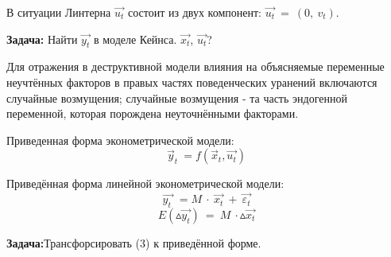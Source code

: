 \documentclass[12pt,a4paper]{article}
\begin{document}
	В ситуации Линтерна $\displaystyle \overrightarrow{u_{t}}$ состоит из двух компонент: $\displaystyle \overrightarrow{u_{t}} \ =\ ( 0,\ v_{t})$.

	\textbf{Задача:} Найти $\displaystyle \overrightarrow{y_{t}}$ в моделе Кейнса. $\displaystyle \overrightarrow{x_{t}}$, $\displaystyle \overrightarrow{u_{t}}$? 

	Для отражения в деструктивной модели влияния на объясняемые переменные неучтённых факторов в правых частях поведенческих уранений включаются случайные возмущения; случайные возмущения - та часть эндогенной переменной, которая порождена неуточнёнными факторами.

	Приведенная форма эконометрической модели:
\begin{equation}
\vec{y}_{t} \ =f\left(\vec{x}_{t} ,\overrightarrow{u_{t}}\right)
\end{equation}

	Приведённая форма линейной эконометрической модели:
\begin{equation}
\overrightarrow{y_{t} \ } \ =M\ \cdotp \ \overrightarrow{x_{t}} \ +\ \overrightarrow{\varepsilon _{t}}
\end{equation}
\begin{equation}
E\left( \vartriangle \overrightarrow{y_{t}}\right) \ =\ M\ \cdotp \vartriangle \overrightarrow{x_{t}}
\end{equation}

\textbf{Задача:}Трансфорсировать (3) к приведённой форме.
\end{document}
